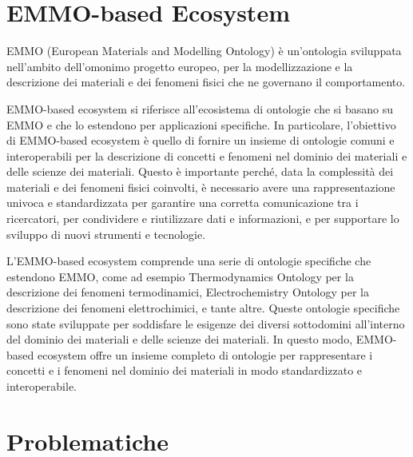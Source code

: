 \section{EMMO-based Ecosystem}
EMMO (European Materials and Modelling Ontology) è un'ontologia sviluppata
nell'ambito dell'omonimo progetto europeo, per la modellizzazione e la
descrizione dei materiali e dei fenomeni fisici che ne governano il
comportamento.

EMMO-based ecosystem si riferisce all'ecosistema di ontologie che si basano su
EMMO e che lo estendono per applicazioni specifiche. In particolare,
l'obiettivo di EMMO-based ecosystem è quello di fornire un insieme di ontologie
comuni e interoperabili per la descrizione di concetti e fenomeni nel dominio
dei materiali e delle scienze dei materiali. Questo è importante perché, data
la complessità dei materiali e dei fenomeni fisici coinvolti, è necessario
avere una rappresentazione univoca e standardizzata per garantire una corretta
comunicazione tra i ricercatori, per condividere e riutilizzare dati e
informazioni, e per supportare lo sviluppo di nuovi strumenti e tecnologie.

L'EMMO-based ecosystem comprende una serie di ontologie specifiche che
estendono EMMO, come ad esempio Thermodynamics Ontology per la descrizione dei
fenomeni termodinamici, Electrochemistry Ontology per la descrizione dei
fenomeni elettrochimici, e tante altre. Queste ontologie specifiche sono state
sviluppate per soddisfare le esigenze dei diversi sottodomini all'interno del
dominio dei materiali e delle scienze dei materiali. In questo modo, EMMO-based
ecosystem offre un insieme completo di ontologie per rappresentare i concetti e
i fenomeni nel dominio dei materiali in modo standardizzato e interoperabile.

\section{Problematiche}